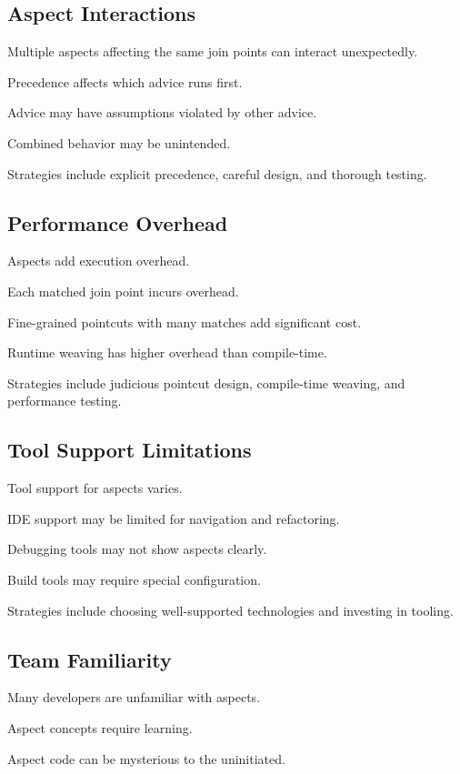 \documentclass[11pt]{article}
\begin{document}
\subsection{Aspect Interactions}

Multiple aspects affecting the same join points can interact unexpectedly.

Precedence affects which advice runs first.

Advice may have assumptions violated by other advice.

Combined behavior may be unintended.

Strategies include explicit precedence, careful design, and thorough testing.

\subsection{Performance Overhead}

Aspects add execution overhead.

Each matched join point incurs overhead.

Fine-grained pointcuts with many matches add significant cost.

Runtime weaving has higher overhead than compile-time.

Strategies include judicious pointcut design, compile-time weaving, and performance testing.

\subsection{Tool Support Limitations}

Tool support for aspects varies.

IDE support may be limited for navigation and refactoring.

Debugging tools may not show aspects clearly.

Build tools may require special configuration.

Strategies include choosing well-supported technologies and investing in tooling.

\subsection{Team Familiarity}

Many developers are unfamiliar with aspects.

Aspect concepts require learning.

Aspect code can be mysterious to the uninitiated.
\end{document}
